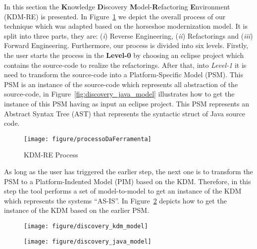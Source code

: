 In this section the \textbf{K}nowledge \textbf{D}iscovery \textbf{M}odel-\textbf{R}efactoring \textbf{E}nvironment (KDM-RE) is presented. 
In Figure~\ref{fig:process} we depict the overall process of our technique which was adapted based on the horseshoe modernization model. 
It is split into three parts, they are: 
(\textit{i}) Reverse Engineering, 
(\textit{ii}) Refactorings and 
(\textit{iii}) Forward Engineering. 
Furthermore, our process is divided into six levels. 
Firstly, the user starts the process in the \textbf{Level-0} by choosing an eclipse project which contains the source-code to realize the refactorings.  
After that, into \textit{Level-1} it is need to transform the source-code into a Platform-Specific Model (PSM). 
This PSM is an instance of the source-code which represents all abstraction of the source-code, in Figure~\ref{fig:discovery_java_model} illustrates how to get the instance of this PSM having as input an eclipse project. 
This PSM represents an Abstract Syntax Tree (AST) that represents the syntactic struct of Java source code.

\begin{figure}[!ht]
\centering
  \texttt{[image: figure/processoDaFerramenta]}
\caption{KDM-RE Process}
\label{fig:process}
\end{figure} 

As long as the user has triggered the earlier step, the next one is to transform the PSM to a Platform-Indented Model (PIM) based on the KDM. 
Therefore, in this step the tool performs a set of model-to-model to get an instance of the KDM which represents the systems ``AS-IS''. 
In Figure~\ref{fig:discovery_kdm_model} depicts how to get the instance of the KDM based on the earlier PSM.

\begin{figure}
\centering
\begin{minipage}{.5\textwidth}
  \centering
  \texttt{[image: figure/discovery\_kdm\_model]}
  \label{fig:discovery_java_model}
\end{minipage}%
\begin{minipage}{.5\textwidth}
  \centering
  \texttt{[image: figure/discovery\_java\_model]}
  \label{fig:discovery_kdm_model}
\end{minipage}
\end{figure}